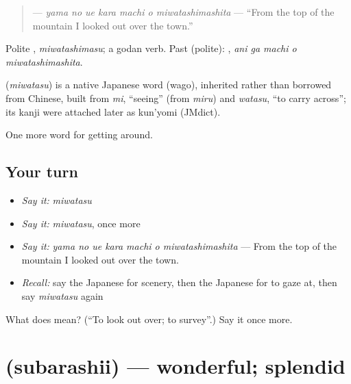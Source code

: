 \begin{quote}
\textbf{   } — \emph{yama no ue kara machi o miwatashimashita} — \textquotedblleft{}From the top of the mountain I looked out over the town.\textquotedblright{}
\end{quote}

Polite \textbf{}, \emph{miwatashimasu}; a godan verb. Past (polite): \textbf{  }, \emph{ani ga machi o miwatashimashita}.

\begin{cousinweb}
\textbf{} (\emph{miwatasu}) is a native Japanese word (wago), inherited rather than borrowed from Chinese, built from \emph{mi}, \textquotedblleft{}seeing\textquotedblright{} (from \emph{miru}) and \emph{watasu}, \textquotedblleft{}to carry across\textquotedblright{}; its kanji were attached later as kun'yomi (JMdict).
\end{cousinweb}

\begin{grammarlens}[title={What you've built}]
One more word for getting around.
\end{grammarlens}

\subsection*{Your turn}
\begin{itemize}
\raggedright
  \item \emph{Say it:} \emph{miwatasu}
  \item \emph{Say it:} \emph{miwatasu}, once more
  \item \emph{Say it:} \emph{yama no ue kara machi o miwatashimashita} — From the top of the mountain I looked out over the town.
  \item \emph{Recall:} say the Japanese for scenery, then the Japanese for to gaze at, then say \emph{miwatasu} again
\end{itemize}

\begin{tcolorbox}[breakable,colback=teal!4,colframe=teal!35!black,title={Before you move on}]
What does  mean? (\textquotedblleft{}To look out over; to survey\textquotedblright{}.) Say it once more.
\end{tcolorbox}
\section[\texorpdfstring{\ja{すばらしい} (subarashii)}{すばらしい (subarashii)}]{ (subarashii) — wonderful; splendid}

